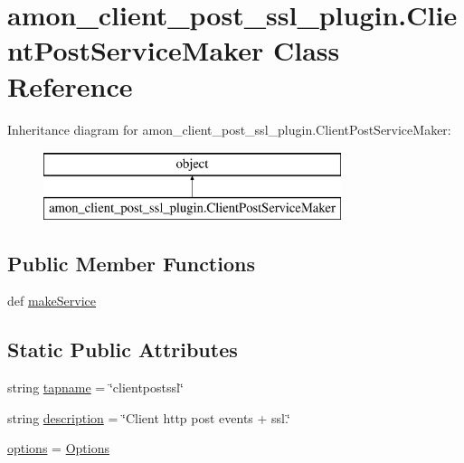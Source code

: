 \hypertarget{classamon__client__post__ssl__plugin_1_1_client_post_service_maker}{\section{amon\-\_\-client\-\_\-post\-\_\-ssl\-\_\-plugin.\-Client\-Post\-Service\-Maker Class Reference}
\label{classamon__client__post__ssl__plugin_1_1_client_post_service_maker}
}
Inheritance diagram for amon\-\_\-client\-\_\-post\-\_\-ssl\-\_\-plugin.\-Client\-Post\-Service\-Maker\-:\begin{figure}[H]
\begin{center}
\leavevmode
\includegraphics[height=2.000000cm]{d5/db5/classamon__client__post__ssl__plugin_1_1_client_post_service_maker}
\end{center}
\end{figure}
\subsection*{Public Member Functions}
\begin{DoxyCompactItemize}
\item 
def \hyperlink{classamon__client__post__ssl__plugin_1_1_client_post_service_maker_aa566ed46391e422830423af5446fa0be}{make\-Service}
\end{DoxyCompactItemize}
\subsection*{Static Public Attributes}
\begin{DoxyCompactItemize}
\item 
string \hyperlink{classamon__client__post__ssl__plugin_1_1_client_post_service_maker_ae0d3fb0cb4076727bf6a0d3196173252}{tapname} = \char`\"{}clientpostssl\char`\"{}
\item 
string \hyperlink{classamon__client__post__ssl__plugin_1_1_client_post_service_maker_a48c44313248ea50b97b26de1acd604cb}{description} = \char`\"{}Client http post events + ssl.\char`\"{}
\item 
\hyperlink{classamon__client__post__ssl__plugin_1_1_client_post_service_maker_a6609a765ab8f1abdb16ada3522a50e70}{options} = \hyperlink{classamon__client__post__ssl__plugin_1_1_options}{Options}
\end{DoxyCompactItemize}


